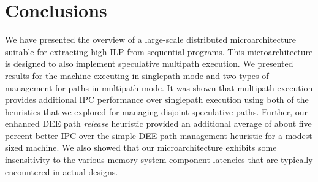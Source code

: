 \documentclass[10pt,dvips]{article}
\begin{document}
\section{Conclusions}
%
We have presented the overview of a large-scale distributed 
microarchitecture suitable for extracting high ILP from
sequential programs.
This microarchitecture is designed to also implement 
speculative multipath execution.  We presented results
for the machine executing in singlepath mode and two types
of management for paths in multipath mode.
It was shown that multipath execution provides additional IPC
performance over singlepath execution using
both of the heuristics that we explored for
managing disjoint speculative paths.
Further, our enhanced DEE path \textit{release} heuristic provided
an additional average of about five percent better IPC over the
simple DEE path management heuristic for a modest sized machine.
We also showed that our microarchitecture exhibits some
insensitivity to the various memory system component latencies
that are typically encountered in actual designs.
%


%
\end{document}
